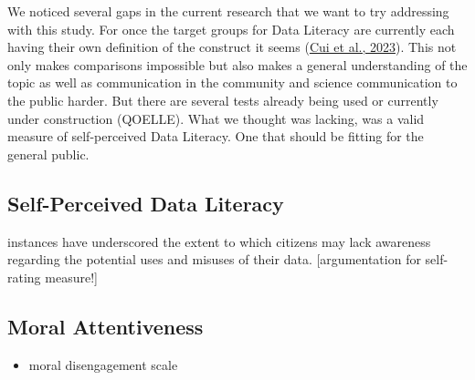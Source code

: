 \documentclass[
  12pt,
  a4paper,
  twoside]{article}
\providecommand{\tightlist}{%
  \setlength{\itemsep}{0pt}\setlength{\parskip}{0pt}}
\begin{document}
We noticed several gaps in the current research that we want to try addressing with this study. For once the target groups for Data Literacy are currently each having their own definition of the construct it seems (\protect\hyperlink{ref-Cui2023}{Cui et al., 2023}). This not only makes comparisons impossible but also makes a general understanding of the topic as well as communication in the community and science communication to the public harder. But there are several tests already being used or currently under construction (QOELLE). What we thought was lacking, was a valid measure of self-perceived Data Literacy. One that should be fitting for the general public.

\hypertarget{self-perceived-data-literacy}{%
\subsection{Self-Perceived Data Literacy}\label{self-perceived-data-literacy}}

instances have underscored the extent to which citizens may lack awareness regarding the potential uses and misuses of their data. {[}argumentation for self-rating measure!{]}

\hypertarget{moral-attentiveness}{%
\subsection{Moral Attentiveness}\label{moral-attentiveness}}

\begin{itemize}
\tightlist
\item
  moral disengagement scale
\end{itemize}
\end{document}
